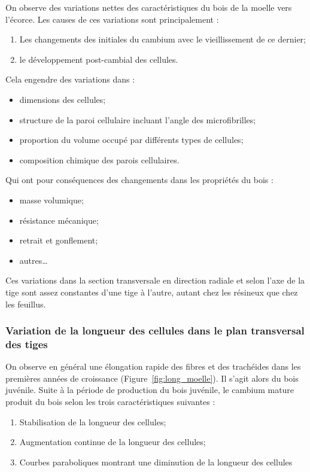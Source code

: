 On observe des variations nettes des caractéristiques du bois de la moelle vers l'écorce. Les causes de ces variations sont principalement :

\begin{enumerate}
\item Les changements des initiales du cambium avec le vieillissement de ce dernier;
\item le développement post-cambial des cellules.
\end{enumerate}

Cela engendre des variations dans :	

\begin{itemize}
\item dimensions des cellules;
\item structure de la paroi cellulaire incluant l'angle des microfibrilles;
\item proportion du volume occupé par différents types de cellules;
\item composition chimique des parois cellulaires.
\end{itemize}

Qui ont pour conséquences des changements dans les propriétés du bois :

\begin{itemize}
\item masse volumique;
\item résistance mécanique;
\item retrait et gonflement;
\item autres\ldots
\end{itemize}

Ces variations dans la section transversale en direction radiale et selon l'axe de la tige sont assez constantes d'une tige à l'autre, autant chez les résineux que chez les feuillus.

\subsubsection{Variation de la longueur des cellules dans le plan transversal des tiges}

On observe en général une élongation rapide des fibres et des trachéides dans les premières années de croissance (Figure~\ref{fig:long_moelle}). Il s'agit alors du bois juvénile. Suite à la période de production du bois juvénile, le cambium mature produit du bois selon les trois caractéristiques suivantes :

\begin{enumerate}
\item Stabilisation de la longueur des cellules;
\item Augmentation continue de la longueur des cellules;
\item Courbes paraboliques montrant une diminution de la longueur des cellules
\end{enumerate}

